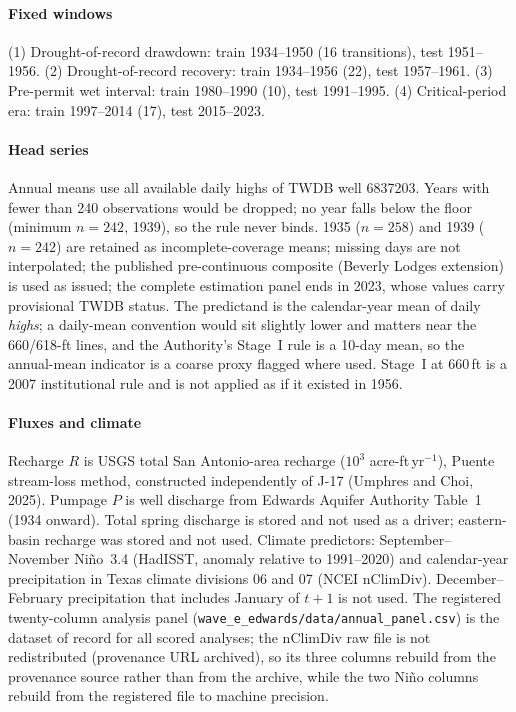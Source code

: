 \documentclass[preprint,11pt,authoryear]{elsarticle}
\theoremstyle{remark}
\begin{document}
\paragraph{Fixed windows} (1) Drought-of-record drawdown: train 1934--1950 (16 transitions), test 1951--1956. (2) Drought-of-record recovery: train 1934--1956 (22), test 1957--1961. (3) Pre-permit wet interval: train 1980--1990 (10), test 1991--1995. (4) Critical-period era: train 1997--2014 (17), test 2015--2023.

\paragraph{Head series} Annual means use all available daily highs of TWDB well 6837203. Years with fewer than 240 observations would be dropped; no year falls below the floor (minimum $n=242$, 1939), so the rule never binds. 1935 ($n=258$) and 1939 ($n=242$) are retained as incomplete-coverage means; missing days are not interpolated; the published pre-continuous composite (Beverly Lodges extension) is used as issued; the complete estimation panel ends in 2023, whose values carry provisional TWDB status. The predictand is the calendar-year mean of daily \emph{highs}; a daily-mean convention would sit slightly lower and matters near the 660/618-ft lines, and the Authority's Stage~I rule is a 10-day mean, so the annual-mean indicator is a coarse proxy flagged where used. Stage~I at 660\,ft is a 2007 institutional rule and is not applied as if it existed in 1956.

\paragraph{Fluxes and climate} Recharge $R$ is USGS total San Antonio-area recharge ($10^3$ acre-ft\,yr$^{-1}$), Puente stream-loss method, constructed independently of J-17 (Umphres and Choi, 2025). Pumpage $P$ is well discharge from Edwards Aquifer Authority Table~1 (1934 onward). Total spring discharge is stored and not used as a driver; eastern-basin recharge was stored and not used. Climate predictors: September--November Ni\~no~3.4 (HadISST, anomaly relative to 1991--2020) and calendar-year precipitation in Texas climate divisions 06 and 07 (NCEI nClimDiv). December--February precipitation that includes January of $t+1$ is not used. The registered twenty-column analysis panel (\texttt{wave\_e\_edwards/data/annual\_panel.csv}) is the dataset of record for all scored analyses; the nClimDiv raw file is not redistributed (provenance URL archived), so its three columns rebuild from the provenance source rather than from the archive, while the two Ni\~no columns rebuild from the registered file to machine precision.
\end{document}
